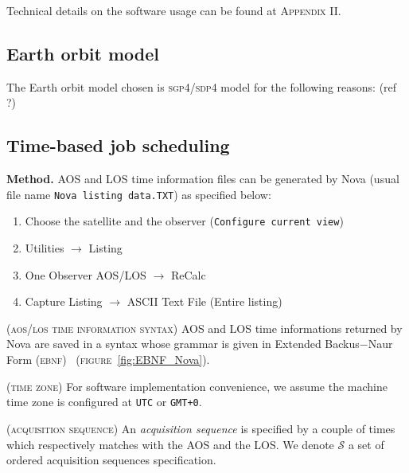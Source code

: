 \documentclass[twocolumn,pre,floats,aps,amsmath,amssymb]{revtex4}
\newenvironment{definition}[1][D\'efinition.]{\begin{trivlist}
\item[\hskip \labelsep {\bfseries #1}]}{\end{trivlist}}
\newenvironment{remark}[1][Remarque.]{\begin{trivlist}
\item[\hskip \labelsep {\bfseries #1}]}{\end{trivlist}}
\begin{document}
\begin{remark}
  Technical details on the software usage can be found at \textsc{Appendix II}.
\end{remark}

\subsection {Earth orbit model}

The Earth orbit model chosen is \textsc{sgp4/sdp4} model for the following reasons: (ref ?)

\subsection {Time-based job scheduling}

\textbf{Method.}
AOS and LOS time information files can be generated by Nova (usual file name \texttt{Nova listing data.TXT}) as specified below:
\begin{enumerate}
\item {Choose the satellite and the observer (\texttt{Configure current view})}
\item {\textup{Utilities} $\rightarrow$ \textup{Listing}}
\item {\textup{One Observer AOS/LOS} $\rightarrow$ \textup{ReCalc}}
\item {\textup{Capture Listing} $\rightarrow$ \textup{ASCII Text File} (Entire listing)}
\end{enumerate}

\begin{remark}
  { \color{rltred}{\Radioactivity} }
  \textsc{(aos/los time information syntax)}
  AOS and LOS time informations returned by Nova are saved in a syntax whose grammar is given in Extended Backus$-$Naur Form (\textsc{ebnf})~\cite{EBNF} (\textsc{figure}~\ref{fig:EBNF_Nova}).
\end{remark}

\begin{remark}
  \textsc{(time zone)}
  For software implementation convenience, we assume the machine time zone is configured at \texttt{UTC} or \texttt{GMT+0}.
\end{remark}

\begin{definition}
  { \color{rltred}{\Radioactivity} }
  \textsc{(acquisition sequence)}
  An \textit{acquisition sequence} is specified by a couple of times which respectively matches with the AOS and the LOS. We denote $\mathcal{S}$ a set of ordered acquisition sequences specification.
\end{definition}
\end{document}
